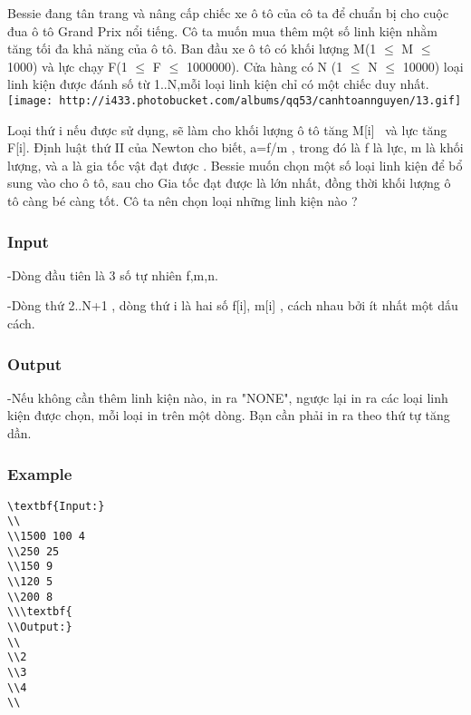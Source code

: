 



   Bessie đang tân trang và nâng cấp chiếc xe ô tô của cô ta để chuẩn bị cho cuộc đua ô tô Grand Prix nổi tiếng. Cô ta muốn mua thêm một số linh kiện nhằm tăng tối đa khả năng của ô tô. Ban đầu xe ô tô có khối lượng M(1 $\le$  M  $\le$ 1000) và lực chạy F(1 $\le$  F  $\le$ 1000000). Cửa hàng có N (1 $\le$  N  $\le$ 10000) loại linh kiện được đánh số từ 1..N,mỗi loại linh kiện chỉ có một chiếc duy nhất.   
\texttt{[image: http://i433.photobucket.com/albums/qq53/canhtoannguyen/13.gif]}

   Loại thứ i nếu được sử dụng, sẽ làm cho khối lượng ô tô tăng M[i]  và lực tăng F[i]. Định luật thứ II của Newton cho biết, a=f/m , trong đó là f là lực, m là khối lượng, và a là gia tốc vật đạt được . Bessie muốn chọn một số loại linh kiện để bổ sung vào cho ô tô, sau cho Gia tốc đạt được là lớn nhất, đồng thời khối lượng ô tô càng bé càng tốt. Cô ta nên chọn loại những linh kiện nào ?  

\subsubsection{   Input  }

   -Dòng đầu tiên là 3 số tự nhiên f,m,n.  

   -Dòng thứ 2..N+1 , dòng thứ i là hai số f[i], m[i] , cách nhau bởi ít nhất một dấu cách.  

\subsubsection{   Output  }

   -Nếu không cần thêm linh kiện nào, in ra "NONE", ngược lại in ra các loại linh kiện được chọn, mỗi loại in trên một dòng. Bạn cần phải in ra theo thứ tự tăng dần.  

\subsubsection{   Example  }
\begin{verbatim}
\textbf{Input:}
\\
\\1500 100 4
\\250 25
\\150 9
\\120 5
\\200 8
\\\textbf{
\\Output:}
\\
\\2
\\3
\\4
\\\end{verbatim}
